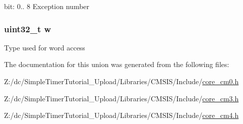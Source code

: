 bit\-: 0.. 8 Exception number \hypertarget{union_i_p_s_r___type_ad0fb62e7a08e70fc5e0a76b67809f84b}{
\subsubsection[{w}]{\setlength{\rightskip}{0pt plus 5cm}uint32\-\_\-t w}}\label{union_i_p_s_r___type_ad0fb62e7a08e70fc5e0a76b67809f84b}
Type used for word access 

The documentation for this union was generated from the following files\-:\begin{DoxyCompactItemize}
\item 
Z\-:/dc/\-Simple\-Timer\-Tutorial\-\_\-\-Upload/\-Libraries/\-C\-M\-S\-I\-S/\-Include/\hyperlink{core__cm0_8h}{core\-\_\-cm0.\-h}\item 
Z\-:/dc/\-Simple\-Timer\-Tutorial\-\_\-\-Upload/\-Libraries/\-C\-M\-S\-I\-S/\-Include/\hyperlink{core__cm3_8h}{core\-\_\-cm3.\-h}\item 
Z\-:/dc/\-Simple\-Timer\-Tutorial\-\_\-\-Upload/\-Libraries/\-C\-M\-S\-I\-S/\-Include/\hyperlink{core__cm4_8h}{core\-\_\-cm4.\-h}\end{DoxyCompactItemize}
